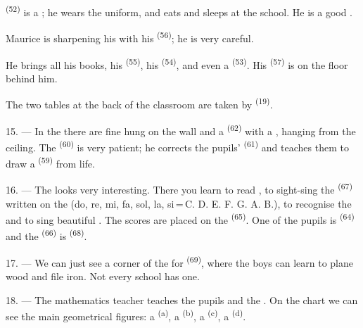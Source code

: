  \textsuperscript{(52)} is a ; he wears the uniform, and eats
and sleeps at the school. He is a good .

Maurice is sharpening his  with his  \textsuperscript{(56)};
he is very careful.

He brings all his books, his  \textsuperscript{(55)}, his
 \textsuperscript{(54)}, and even a  \textsuperscript{(53)}. His
 \textsuperscript{(57)} is on the floor behind him.

The two tables at the back of the classroom are taken by
 \textsuperscript{(19)}.

\VUsaut{4.6mm}
\VUsaut{3.4mm}

15. --- In the  there are fine  hung on the wall and a
 \textsuperscript{(62)} with a , hanging from the ceiling. The
 \textsuperscript{(60)} is very patient; he corrects the pupils'
 \textsuperscript{(61)} and teaches them to draw a 
\textsuperscript{(59)} from life.

16. --- The  looks very interesting. There you learn to read
, to sight-sing the  \textsuperscript{(67)} written on the
 (do, re, mi, fa, sol, la, si\,=\,C. D. E. F. G. A. B.), to
recognise the  and to sing beautiful . The scores are placed on
the  \textsuperscript{(65)}. One of the pupils is
 \textsuperscript{(64)} and the 
\textsuperscript{(66)} is  \textsuperscript{(68)}.

17. --- We can just see a corner of the  for
 \textsuperscript{(69)}, where the boys can learn to plane wood
and file iron. Not every school has one.

\VUsaut{5.0mm}
\VUsaut{3.6mm}

18. --- The mathematics teacher teaches the pupils 
 and the . On the chart we
can see the main geometrical figures: a  \textsuperscript{(a)}, a
 \textsuperscript{(b)}, a  \textsuperscript{(c)}, a 
\textsuperscript{(d)}.

